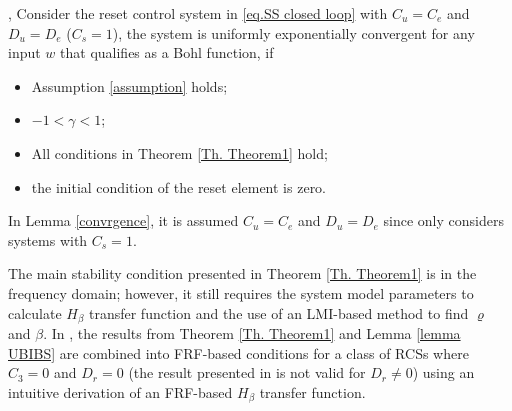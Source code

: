 \begin{lemma}
\label{convrgence}
\cite[Lemma 2]{dastjerdi2022closed}, Consider the reset control system in \eqref{eq.SS closed loop} with $C_u=C_e$ and $D_u=D_e$ ($C_s=1$), the system is uniformly exponentially convergent \cite[Definition 2]{pavlov2007frequency} for any input $w$ that qualifies as a Bohl function, if
\begin{itemize}
 \item Assumption \ref{assumption} holds;
        \item $-1<\gamma<1$;
    \item All conditions in Theorem \ref{Th. Theorem1} hold;
\item the initial condition of the reset element is zero.\\
\end{itemize}
\end{lemma}

\begin{remark}
    \label{proof explanation}
    In Lemma \ref{convrgence}, it is assumed $C_u=C_e$ and $D_u=D_e$ since \cite{dastjerdi2022closed} only considers systems with $C_s=1$.\\
\end{remark}

The main stability condition presented in Theorem \ref{Th. Theorem1} is in the frequency domain; however, it still requires the system model parameters to calculate $H_\beta$ transfer function and the use of an LMI-based method to find $\varrho$ and $\beta$. In \cite[Theorem 2]{dastjerdi2023frequency}, the results from Theorem \ref{Th. Theorem1} and Lemma \ref{lemma UBIBS} are combined into FRF-based conditions for a class of RCSs where $C_3=0$ and $D_r=0$ (the result presented in \cite{dastjerdi2023frequency} is not valid for $D_r\neq0$) using an intuitive derivation of an FRF-based $H_\beta$ transfer function.\\


